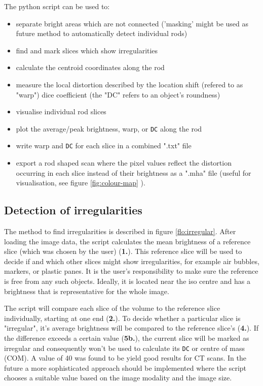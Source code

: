 The python script can be used to:
\begin{itemize}
 \item separate bright areas which are not connected ('masking' might be used as future method to automatically detect individual rods)
 \item find and mark slices which show irregularities
 \item calculate the centroid coordinates along the rod
 \item measure the local distortion described by the
  \subitem location shift (refered to as "warp")
  \subitem dice coefficient (the "DC" refers to an object's roundness)
 \item visualise individual rod slices
 \item plot the average/peak brightness, warp, or \texttt{DC} along the rod
 \item write warp and \texttt{DC}  for each slice in a combined ".txt" file
 \item export a rod shaped scan where the pixel values reflect the distortion occurring in each slice instead of their brightness as a ".mha" file (useful for visualisation, see figure \ref{fig:colour-map} ).
\end{itemize}

\subsection{Detection of irregularities}

The method to find irregularities is described in figure \ref{flo:irregular}.
After loading the image data, the script calculates the mean brightness of a reference slice (which was chosen by the user) (\textbf{1.}).
This reference slice will be used to decide if and which other slices might show irregularities, for example air bubbles, markers, or plastic panes.
It is the user's responsibility to make sure the reference is free from any such objects.
Ideally, it is located near the iso centre and has a brightness that is representative for the whole image.

The script will compare each slice of the volume to the reference slice individually, starting at one end (\textbf{2.}).
To decide whether a particular slice is "irregular", it's average brightness will be compared to the reference slice's (\textbf{4.}).
If the difference exceeds a certain value (\textbf{5b.}), the current slice will be marked as irregular and consequently won't be used to calculate its \texttt{DC} or centre of mass (COM).
A value of 40 was found to be yield good results for CT scans.
In the future a more sophisticated approach should be implemented where the script chooses a suitable value based on the image modality and the image size.

